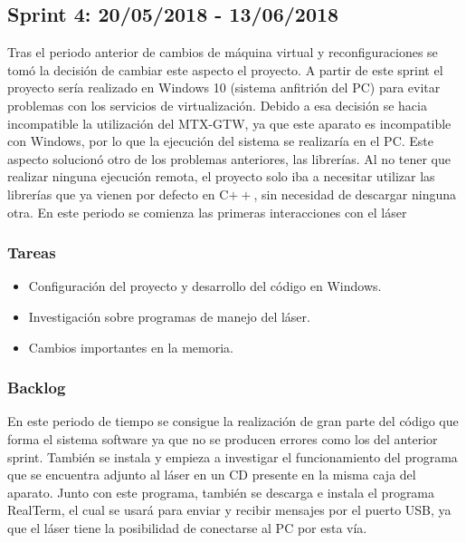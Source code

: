 \subsection{Sprint 4: 20/05/2018 - 13/06/2018}
Tras el periodo anterior de cambios de máquina virtual y reconfiguraciones se tomó la decisión de cambiar este aspecto el proyecto. A partir de este sprint el proyecto sería realizado en Windows 10 (sistema anfitrión del PC) para evitar problemas con los servicios de virtualización. Debido a esa decisión se hacia incompatible la utilización del MTX-GTW, ya que este aparato es incompatible con Windows, por lo que la ejecución del sistema se realizaría en el PC. Este aspecto solucionó otro de los problemas anteriores, las librerías. Al no tener que realizar ninguna ejecución remota, el proyecto solo iba a necesitar utilizar las librerías que ya vienen por defecto en C$++$, sin necesidad de descargar ninguna otra. En este periodo se comienza las primeras interacciones con el láser
\subsubsection{Tareas}
\begin{itemize}
	\item Configuración del proyecto y desarrollo del código en Windows.
	\item Investigación sobre programas de manejo del láser.
	\item Cambios importantes en la memoria.
\end{itemize}
\subsubsection{Backlog}
En este periodo de tiempo se consigue la realización de gran parte del código que forma el sistema software ya que no se producen errores como los del anterior sprint. También se instala y empieza a investigar el funcionamiento del programa que se encuentra adjunto al láser en un CD presente en la misma caja del aparato. Junto con este programa, también se descarga e instala el programa RealTerm, el cual se usará para enviar y recibir mensajes por el puerto USB, ya que el láser tiene la posibilidad de conectarse al PC por esta vía.
